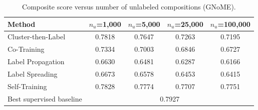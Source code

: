\begin{table}[H]
\centering\small
\begin{tabular}{lcccc}
\toprule
Method & $n_u$=1,000 & $n_u$=5,000 & $n_u$=25,000 & $n_u$=100,000\\
\midrule
Cluster-then-Label & 0.7818 & 0.7647 & 0.7263 & 0.7195 \\
Co-Training & 0.7334 & 0.7003 & 0.6846 & 0.6727 \\
Label Propagation & 0.6630 & 0.6481 & 0.6287 & 0.6166 \\
Label Spreading & 0.6673 & 0.6578 & 0.6453 & 0.6415 \\
Self-Training & 0.7828 & 0.7774 & 0.7707 & 0.7751 \\
\midrule
Best supervised baseline & \multicolumn{4}{c}{0.7927}\\
\bottomrule
\end{tabular}
\caption*{Composite score versus number of unlabeled compositions (GNoME).}
\end{table}
